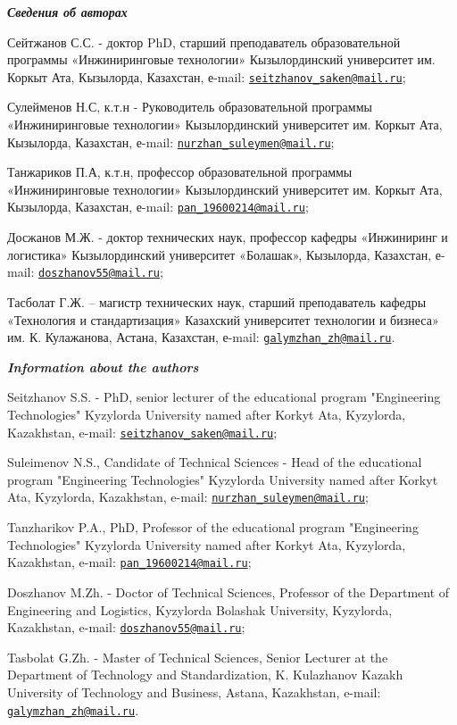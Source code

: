 \begin{noparindent}
\hspace{1em}\emph{{\bfseries Сведения об авторах}}

Сейтжанов С.С. - доктор PhD, старший преподаватель образовательной
программы «Инжиниринговые технологии» Кызылординский университет им.
Коркыт Ата, Кызылорда, Казахстан, е-mail:
\href{mailto:seitzhanov_saken@mail.ru}{\nolinkurl{seitzhanov\_saken@mail.ru}};

Сулейменов Н.С, к.т.н - Руководитель образовательной программы
«Инжиниринговые технологии» Кызылординский университет им. Коркыт Ата,
Кызылорда, Казахстан, е-mail:
\href{mailto:nurzhan_suleymen@mail.ru}{\nolinkurl{nurzhan\_suleymen@mail.ru}};

Танжариков П.А, к.т.н, профессор образовательной программы
«Инжиниринговые технологии» Кызылординский университет им. Коркыт Ата,
Кызылорда, Казахстан, е-mail:
\href{mailto:pan_19600214@mail.ru}{\nolinkurl{pan\_19600214@mail.ru}};

Досжанов М.Ж. - доктор технических наук, профессор кафедры «Инжиниринг и
логистика» Кызылординский университет «Болашак», Кызылорда, Казахстан,
е-mail:
\href{mailto:doszhanov55@mail.ru}{\nolinkurl{doszhanov55@mail.ru}};

Тасболат Г.Ж. -- магистр технических наук, старший преподаватель кафедры
«Технология и стандартизация» Казахский университет технологии и
бизнеса» им. К. Кулажанова, Астана, Казахстан, е-mail:
\href{mailto:galymzhan_zh@mail.ru}{\nolinkurl{galymzhan\_zh@mail.ru}}.

\hspace{1em}\emph{{\bfseries Information about the authors}}

Seitzhanov S.S. - PhD, senior lecturer of the educational program
"Engineering Technologies" Kyzylorda University named after Korkyt Ata,
Kyzylorda, Kazakhstan, e-mail:
\href{mailto:seitzhanov_saken@mail.ru}{\nolinkurl{seitzhanov\_saken@mail.ru}};

Suleimenov N.S., Candidate of Technical Sciences - Head of the
educational program "Engineering Technologies" Kyzylorda University
named after Korkyt Ata, Kyzylorda, Kazakhstan, e-mail:
\href{mailto:nurzhan_suleymen@mail.ru}{\nolinkurl{nurzhan\_suleymen@mail.ru}};

Tanzharikov P.A., PhD, Professor of the educational program "Engineering
Technologies" Kyzylorda University named after Korkyt Ata, Kyzylorda,
Kazakhstan, e-mail:
\href{mailto:pan_19600214@mail.ru}{\nolinkurl{pan\_19600214@mail.ru}};

Doszhanov M.Zh. - Doctor of Technical Sciences, Professor of the
Department of Engineering and Logistics, Kyzylorda Bolashak University,
Kyzylorda, Kazakhstan, e-mail:
\href{mailto:doszhanov55@mail.ru}{\nolinkurl{doszhanov55@mail.ru}};

Tasbolat G.Zh. - Master of Technical Sciences, Senior Lecturer at the
Department of Technology and Standardization, K. Kulazhanov Kazakh
University of Technology and Business, Astana, Kazakhstan, e-mail:
\href{mailto:galymzhan_zh@mail.ru}{\nolinkurl{galymzhan\_zh@mail.ru}}.
\end{noparindent}
